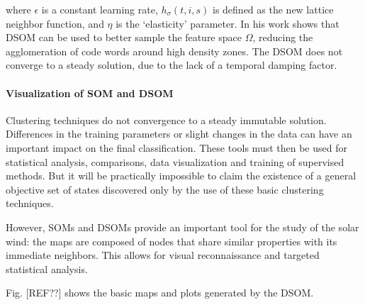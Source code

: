 where $\epsilon$ is a constant learning rate, $h_\sigma(t,i,s)$ is defined as the new lattice neighbor function, and $\eta$ is the `elasticity' parameter. In his work \citep{Rougier2011} shows that DSOM can be used to better sample the feature space $\Omega$, reducing the agglomeration of code words around high density zones. The DSOM does not converge to a steady solution, due to the lack of a temporal damping factor.

\paragraph{Visualization of SOM and DSOM}
Clustering techniques do not convergence to a steady immutable solution. Differences in the training parameters or slight changes in the data can have an important impact on the final classification. These tools must then be used for statistical analysis, comparisons, data visualization and training of supervised methods. But it will be practically impossible to claim the existence of a general objective set of states discovered only by the use of these basic clustering techniques.

However, SOMs and DSOMs provide an important tool for the study of the solar wind: the maps are composed of nodes that share similar properties with its immediate neighbors. This allows for visual reconnaissance and targeted statistical analysis.

Fig. [REF??] shows the basic maps and plots generated by the DSOM.